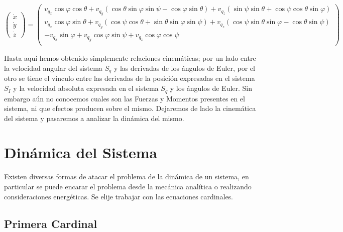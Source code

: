 \documentclass[main]{subfiles}
\begin{document}
\begin{footnotesize}
\begin{equation}
\left( \begin{array}{c}
\dot{x}\\
\dot{y}\\
\dot{z}
\end{array}  \right) = \left( \begin{array}{c}
v_{q_x} \cos \varphi \cos \theta + v_{q_y} ( \cos \theta \sin \varphi \sin \psi-\cos \varphi \sin \theta ) + v_{q_z}(\sin \psi \sin \theta + \cos \psi \cos \theta \sin \varphi)  \\
v_{q_x} \cos \varphi \sin \theta + v_{q_y} (\cos \psi \cos \theta + \sin \theta \sin \varphi \sin \psi) + v_{q_z}( \cos \psi \sin \theta \sin \varphi-\cos \theta \sin \psi ) \\
-v_{q_x} \sin \varphi  + v_{q_y} \cos \varphi \sin \psi  + v_{q_z}\cos \varphi \cos \psi \\
\end{array} \right)
\label{eq:pospunto}
\end{equation}
\end{footnotesize} 

Hasta aqu\'i hemos obtenido simplemente relaciones cinem\'aticas; por un lado entre la velocidad angular del sistema $S_q$ y las derivadas de los \'angulos de Euler, por el otro se tiene el v\'inculo entre las derivadas de la posici\'on expresadas en el sistema $S_I$ y la velocidad absoluta expresada en el sistema $S_q$ y los \'angulos de Euler. Sin embargo a\'un no conocemos cuales son las Fuerzas y Momentos presentes en el sistema, ni que efectos producen sobre el mismo. Dejaremos de lado la cinem\'atica del sistema y pasaremos a analizar la din\'amica del mismo.

\section{Din\'amica del Sistema}
Existen diversas formas de atacar el problema de la din\'amica de un sistema, en particular se puede encarar el problema desde la mec\'anica anal\'itica o realizando consideraciones energ\'eticas. Se elije trabajar con las ecuaciones cardinales. 
\subsection{Primera Cardinal}
 
\end{document}
